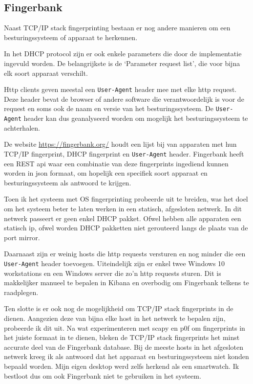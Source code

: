 \documentclass[a4paper, 12pt]{report}
\begin{document}
\subsection{Fingerbank}
\label{sec:fingerbank}
Naast TCP/IP stack fingerprinting bestaan er nog andere manieren om een besturingssysteem of apparaat te herkennen.

In het DHCP protocol zijn er ook enkele parameters die door de implementatie ingevuld worden.
De belangrijkste is de `Parameter request list', die voor bijna elk soort apparaat verschilt.

Http clients geven meestal een \lstinline|User-Agent| header mee met elke http request.
Deze header bevat de browser of andere software die verantwoordelijk is voor de request en soms ook de naam en versie van het besturingssysteem.
De \lstinline|User-Agent| header kan dus geanalyseerd worden om mogelijk het besturingssysteem te achterhalen.

De website \url{https://fingerbank.org/} houdt een lijst bij van apparaten met hun TCP/IP fingerprint, DHCP fingerprint en \lstinline|User-Agent| header.
Fingerbank heeft een REST api waar een combinatie van deze fingerprints ingediend kunnen worden in json formaat, om hopelijk een specifiek soort apparaat en besturingssysteem als antwoord te krijgen.

Toen ik het systeem met OS fingerprinting probeerde uit te breiden, was het doel om het systeem beter te laten werken in een statisch, afgesloten netwerk.
In dit netwerk passeert er geen enkel DHCP pakket.
Ofwel hebben alle apparaten een statisch ip, ofwel worden DHCP pakketten niet gerouteerd langs de plaats van de port mirror.

Daarnaast zijn er weinig hosts die http requests versturen en nog minder die een \lstinline|User-Agent| header toevoegen.
Uiteindelijk zijn er enkel twee Windows 10 workstations en een Windows server die zo'n http requests sturen.
Dit is makkelijker manueel te bepalen in Kibana en overbodig om Fingerbank telkens te raadplegen.

Ten slotte is er ook nog de mogelijkheid om TCP/IP stack fingerprints in de dienen.
Aangezien deze van bijna elke host in het netwerk te bepalen zijn, probeerde ik dit uit.
Na wat experimenteren met scapy en p0f om fingerprints in het juiste formaat in te dienen, bleken de TCP/IP stack fingerprints het minst accurate deel van de Fingerbank database.
Bij de meeste hosts in het afgesloten netwerk kreeg ik als antwoord dat het apparaat en besturingssysteem niet konden bepaald worden.
Mijn eigen desktop werd zelfs herkend als een smartwatch.
Ik bestloot dus om ook Fingerbank niet te gebruiken in het systeem.
\end{document}

